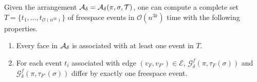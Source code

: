 \documentclass[thm-restate]{lipics-v2021}
\theoremstyle{remark}
\newcommand{\Oh}{\mathcal{O}}
\newcommand{\graph}[0]{\mathcal{G}}
\newcommand{\edges}[0]{\mathcal{E}}
\newcommand{\fsgraph}[0]{\graph^{f}}
\newcommand{\trans}[0]{\mathcal{T}}
\begin{document}
\begin{lemma} \label{lem:events-from-arrangement}
    Given the arrangement $\arrangement = \arrangement(\pi, \sigma, \trans)$, one can compute a complete set $T = \{t_1, ..., t_{\Oh(n^{3k})}\}$ of freespace events in $\Oh(n^{3k})$ time with the following properties.
    \begin{enumerate}
        \item Every face in $\mathcal{A_\delta}$ is associated with at least one event in $T$. 
        \item For each event $t_i$ associated with edge $(v_F, v_{F'}) \in \edges$, $\fsgraph_\delta(\pi, \tau_F(\sigma))$ and $\fsgraph_\delta(\pi, \tau_{F'}(\sigma))$ differ by exactly one freespace event. 
    \end{enumerate}
\end{lemma}
\end{document}
